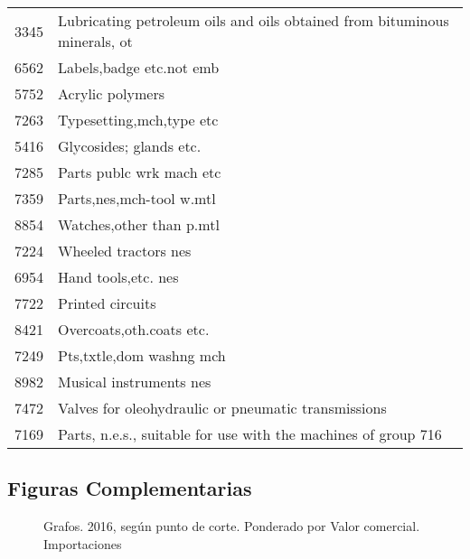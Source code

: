 \documentclass[class=article, crop=false]{standalone}
\begin{document}
\begin{longtable}{ll}
	3345          & Lubricating petroleum oils and oils obtained from bituminous minerals, ot \\
	6562          & Labels,badge etc.not emb                                                  \\
	5752          & Acrylic polymers                                                          \\
	7263          & Typesetting,mch,type etc                                                  \\
	5416          & Glycosides; glands etc.                                                   \\
	7285          & Parts publc wrk mach etc                                                  \\
	7359          & Parts,nes,mch-tool w.mtl                                                  \\
	8854          & Watches,other than p.mtl                                                  \\
	7224          & Wheeled tractors nes                                                      \\
	6954          & Hand tools,etc. nes                                                       \\
	7722          & Printed circuits                                                          \\
	8421          & Overcoats,oth.coats etc.                                                  \\
	7249          & Pts,txtle,dom washng mch                                                  \\
	8982          & Musical instruments nes                                                   \\
	7472          & Valves for oleohydraulic or pneumatic transmissions                       \\
	7169          & Parts, n.e.s., suitable for use with the machines of group 716            \\ \hline
\end{longtable}

\pagebreak

\subsection{Figuras Complementarias}\label{sec:fig_comp}

\begin{figure}
	\centering
	\caption{Grafos. 2016, según punto de corte. Ponderado por Valor comercial. Importaciones}
	\label{fig:grafo_2016_circular}
\end{figure}
\end{document}
